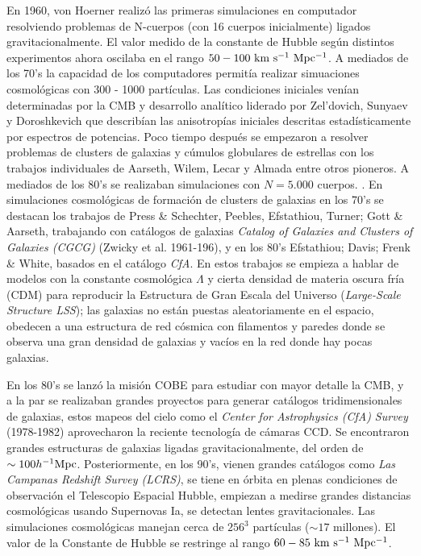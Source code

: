 \documentclass[preprint]{aastex62}
\begin{document}
  
  En 1960, von Hoerner realizó las primeras simulaciones en computador resolviendo problemas
  de N-cuerpos (con 16 cuerpos inicialmente) ligados gravitacionalmente. El valor medido de
  la constante de Hubble según distintos experimentos ahora oscilaba en el rango
  $50-100 \rm~km~s^{-1}~Mpc^{-1}$.  
  A mediados de los 70's la capacidad de los computadores permitía realizar simuaciones
  cosmológicas con 300 - 1000 partículas. Las condiciones iniciales venían determinadas por
  la CMB y desarrollo analítico liderado por Zel'dovich, Sunyaev y Doroshkevich
  que describían las anisotropías iniciales descritas estadísticamente por espectros de
  potencias. Poco tiempo después se empezaron a resolver problemas de clusters de galaxias
  y cúmulos globulares de estrellas
  con los trabajos individuales de Aarseth, Wilem, Lecar y Almada entre otros pioneros. A
  mediados de los 80's se realizaban simulaciones con $N = 5.000$ cuerpos.
  \citep{Aarseth2003, Press&Schechter1974}.
  En simulaciones cosmológicas de formación de clusters de galaxias en los 70's
  se destacan los trabajos de Press \& Schechter, Peebles, Efstathiou, Turner; Gott \& Aarseth,
  trabajando con catálogos de galaxias \textit{Catalog of Galaxies and Clusters of Galaxies
    (CGCG)} (Zwicky et al. 1961-196), y en los 80's Efstathiou; Davis; Frenk \& White, basados
  en el catálogo \textit{CfA}. En estos trabajos se empieza a hablar de modelos con la
  constante cosmológica $\Lambda$ y cierta densidad de materia oscura fría (CDM) para reproducir
  la Estructura de Gran Escala del Universo  (\textit{Large-Scale
    Structure LSS}); las galaxias no están puestas aleatoriamente en el espacio, obedecen
  a una estructura de red cósmica con filamentos y paredes donde se observa una gran
  densidad de galaxias y vacíos en la red donde hay pocas galaxias. 
    
  En los 80's se lanzó la misión COBE para estudiar con mayor detalle la CMB,
  y a la par se realizaban grandes proyectos para generar catálogos tridimensionales de
  galaxias, estos mapeos del cielo como el \textit{Center for Astrophysics (CfA) Survey}
  (1978-1982) aprovecharon la reciente tecnología de cámaras CCD. Se encontraron grandes
  estructuras de galaxias ligadas gravitacionalmente, del orden de $\sim 100 h^{-1}\rm Mpc$.
  Posteriormente, en los 90's, vienen grandes catálogos como  \textit{Las Campanas Redshift
    Survey (LCRS)}, se tiene en órbita en plenas condiciones de observación el Telescopio
  Espacial Hubble, empiezan a medirse grandes distancias cosmológicas usando Supernovas Ia,
  se detectan lentes gravitacionales. Las simulaciones cosmológicas manejan cerca de
  $256^3$ partículas ($\sim 17$ millones). El valor de la Constante de Hubble se restringe
  al rango  $60-85 \rm~km~s^{-1}~Mpc^{-1}$.     \citep{Schneider2014}
  
\end{document}
